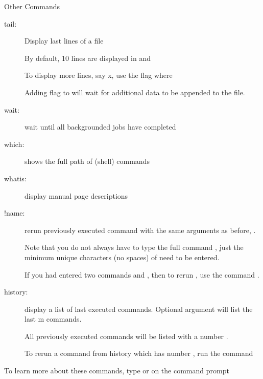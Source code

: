\documentclass[10pt,t]{beamer}
\begin{document}
\begin{frame}{Other Commands}
\begin{description}
    \item[tail:] Display last lines of a file 
    \item[] By default, 10 lines are displayed in  and 
    \item[] To display more lines, say x, use the flag  where
    \item[] Adding  flag to  will wait for additional data to be appended to the file.
    \item[wait:] wait until all backgrounded jobs have completed
    \item[which:] shows the full path of (shell) commands
    \item[whatis:] display manual page descriptions
    \item[!name:] rerun previously executed command with the same arguments as before, .
    \item[] Note that you do not always have to type the full command , just the minimum unique characters (no spaces) of  need to be entered.
    \item[] If you had entered two commands  and , then to rerun , use the command . 
    \item[history:] display a list of last executed commands. Optional argument  will list the last m commands. 
    \item[] All previously executed commands will be listed with a number .
    \item[] To rerun a command from history which has number , run the command  
  \end{description}
  To learn more about these commands, type  or   on the command prompt
\end{frame}
\end{document}
